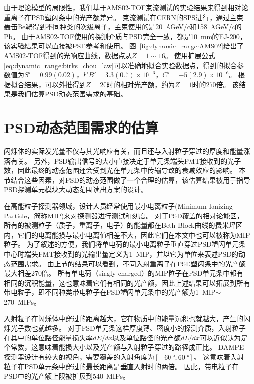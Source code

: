 由于理论模型的局限性，我们基于AMS02-TOF束流测试的实验结果\cite{bindi_performance_2005}来得到相对论重离子在PSD塑闪条中的光产额差异。
束流测试在CERN的SPS进行，通过主束轰击Be靶得到不同种类的次级离子，主束使用的是\SI{20}{AGeV/c}和\SI{158}{AGeV/c}的Pb。
由于AMS02-TOF使用的探测介质与PSD完全一致，都是\SI{10}{mm}的EJ-200，该实验结果可以直接被PSD参考和使用。
图~\ref{fig:dynamic_range:AMS02}给出了AMS02-TOF得到的光响应曲线，数据点从$Z=1\sim16$。
使用扩展公式\ref{eq:dynamic_range:birks_chou_law}可以准确地拟合实验数据点，得到的拟合参数值为$S'=0.99(0.02)$，$k'B'=3.3(0.7)\times10^{-3}$，$C'=-5(2.9)\times10^{-6}$。
根据拟合结果，可以外推得到$Z=20$时的相对光产额，约为$Z=1$时的270倍。
该结果是我们估算PSD动态范围需求的基础。



\section{PSD动态范围需求的估算}
\label{sec:dynamic_range:estimation}
闪烁体的实际发光量不仅与其光响应有关，而且还与入射粒子穿过的厚度和能量涨落有关。
另外，PSD输出信号的大小直接决定于单元条端头PMT接收到的光子数，因此最终的动态范围还会受到光在单元条中传输导致的衰减效应的影响。
本节结合这些因素，对PSD的动态范围做了一个合理的估算，该估算结果被用于指导PSD探测单元模块大动态范围读出方案的设计。

在高能粒子探测器领域，设计人员经常使用最小电离粒子(Minimum Ionizing Particle，简称MIP)来对探测器进行测试和刻度。
对于PSD覆盖的相对论能区，所有的被测粒子（质子，重离子，电子）的能量都在Beth-Block曲线的费米坪区内，它们的电离能损与最小电离值相差不大，因此它们在本文中也可以被称为MIP粒子。
为了叙述的方便，我们将单电荷的最小电离粒子垂直穿过PSD塑闪单元条中心时端头PMT接收到的光输出量定义为\SI{1}{MIP}，并以它为单位来表述PSD的动态范围需求。
由上节的结果可以看到，不同入射重离子在PSD塑闪条中的光产额最大相差270倍。
所有单电荷（singly charged）的MIP粒子在PSD单元条中都有相同的沉积能量，这也意味着它们有相同的光产额，因此上述结果可以拓展到所有带电粒子，即不同种类带电粒子在PSD塑闪单元条中的光产额为\SI{1}{MIP}$\sim$\SI{270}{MIPs}。

入射粒子在闪烁体中穿过的距离越大，它在物质中的能量沉积也就越大，产生的闪烁光子数也就越多。
对于PSD单元条这样厚度薄、密度小的探测介质，入射粒子在其中的单位路径能量损失率$dE/dx$以及单位路径的光产额$dL/dx$可以近似认为是个常数，这意味着能损大小以及光产额与入射粒子穿过的路径成正比。
DAMPE探测器设计有较大的视角，需要覆盖的入射角度为$[\SI{-60}{\degree},\SI{60}{\degree}]$。
这意味着入射粒子在PSD单元条中穿过的最长距离是垂直入射时的两倍。
因此，带电粒子在PSD中的光产额上限被扩展到\SI{540}{MIPs}。

